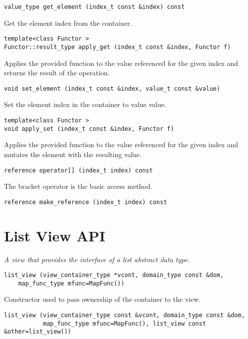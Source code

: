 \begin{verbatim}
value_type get_element (index_t const &index) const
\end{verbatim}

Get the element index from the container.

\begin{verbatim}
template<class Functor >
Functor::result_type apply_get (index_t const &index, Functor f)
\end{verbatim}

Applies the provided function to the value referenced for the given index and returns the result of the operation.

\begin{verbatim}
void set_element (index_t const &index, value_t const &value)
\end{verbatim}

Set the element index in the container to value value.

\begin{verbatim}
template<class Functor >
void apply_set (index_t const &index, Functor f)
\end{verbatim}

Applies the provided function to the value referenced for the given index and mutates the element with the resulting value.

\begin{verbatim}
reference operator[] (index_t index) const
\end{verbatim}

The bracket operator is the basic access method.

\begin{verbatim}
reference make_reference (index_t index) const
\end{verbatim}

\section{List View API } \label{sec-list-vw}

\emph{A view that provides the interface of a list abstract data type. }

\begin{verbatim}
list_view (view_container_type *vcont, domain_type const &dom,
    map_func_type mfunc=MapFunc())
\end{verbatim}

Constructor used to pass ownership of the container to the view.

\begin{verbatim}
list_view (view_container_type const &vcont, domain_type const &dom,
           map_func_type mfunc=MapFunc(), list_view const &other=list_view())
\end{verbatim}

